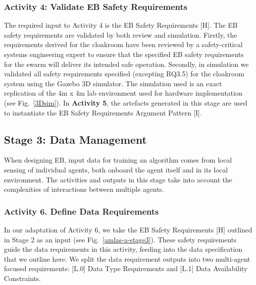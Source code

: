 \documentclass[runningheads]{llncs}
\begin{document}
\subsubsection*{Activity 4: Validate EB Safety Requirements}

The required input to Activity 4 is the EB Safety Requirements [H].  
The EB safety requirements are validated by both review and simulation.
Firstly, the requirements derived for the cloakroom have been reviewed by a safety-critical systems engineering expert to ensure that the specified EB safety requirements for the swarm will deliver its intended safe operation. Secondly, in simulation we validated all safety requirements specified (excepting RQ3.5) for the cloakroom system using the Gazebo 3D simulator. 
The simulation used is an exact replication of the 4m x 4m lab environment used for hardware implementation (see Fig.~\ref{3Dsim}). 
In \textbf{Activity 5}, the artefacts generated in this stage are used to instantiate the EB Safety Requirements Argument Pattern [I].



\subsection{Stage 3: Data Management} \label{framework-stage3}
When designing EB, input data for training an algorithm comes from local sensing of individual agents, both onboard the agent itself and in its local environment. The activities and outputs in this stage take into account the complexities of interactions between multiple agents.


\subsubsection*{Activity 6. Define Data Requirements}
In our adaptation of Activity 6, we take the EB Safety Requirements [H] outlined in Stage 2 as an input (see Fig.~\ref{amlas-a-stage3}). These safety requirements guide the data requirements in this activity, feeding into the data specification that we outline here. We split the data requirement outputs into two multi-agent focused requirements: [L.0] Data Type Requirements and [L.1] Data Availability Constraints.
\end{document}
